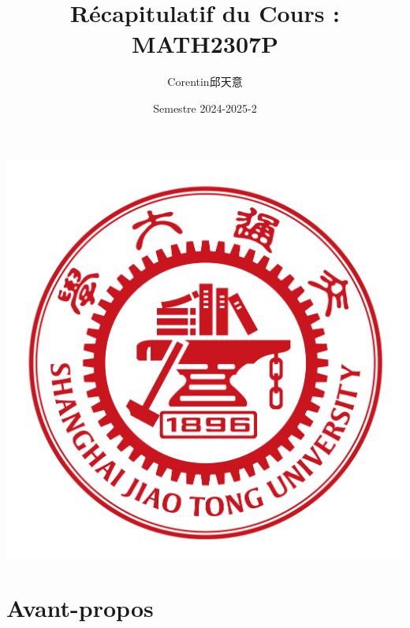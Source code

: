\documentclass{article}
\title{\textbf{Récapitulatif du Cours :\\ MATH2307P}}
\author{Corentin邱天意}
\date{Semestre 2024-2025-2}
\begin{document}
\maketitle

\centerline{\includegraphics[scale=0.4]{sjtu}}

\newpage

\section*{Avant-propos}



\newpage
\tableofcontents

\newpage
\end{document}
